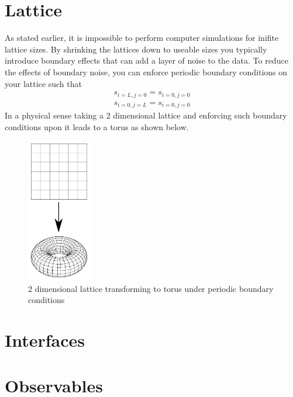 \section{Lattice}
As stated earlier, it is impossible to perform computer simulations for inifite lattice sizes.
By shrinking the lattices down to useable sizes you typically introduce boundary effects that can add a layer of noise to the data.
To reduce the effects of boundary noise, you can enforce periodic boundary conditions on your lattice such that
\begin{equation}
	\begin{split}
		s_{i=L,j=0} = s_{i=0,j=0}  \\
		s_{i=0,j=L} = s_{i=0,j=0}
	\end{split}
\end{equation}
In a physical sense taking a 2 dimensional lattice and enforcing such boundary conditions upon it leads to a torus as shown below.
\begin{figure}[h!]
	\centering
	\includegraphics[width=0.25\textwidth]{2-Theory/latticetotorus.png}
	\caption{2 dimensional lattice transforming to torus under periodic boundary conditions}
\end{figure}

\section{Interfaces}

\section{Observables}
